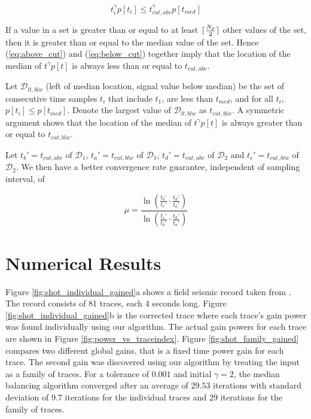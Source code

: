 \documentclass{segabs}
\DeclarePairedDelimiter{\ceil}{\lceil}{\rceil}
\newcommand{\Done}{{\mathcal{D}_1}}
\newcommand{\Dtwo}{{\mathcal{D}_2}}
\newcommand{\Dleftbelow}{{\mathcal{D}_{lt,blw}}}
\newcommand{\tcut}{t_{cut,abv}}
\newcommand{\tcutbelow}{t_{cut,blw}}
\begin{document}
\begin{equation}
\label{eq:below_cut}
t_i^\gamma p[t_i] \leq \tcut^\gamma p[t_{med}]
\end{equation} 

If a value in a set is greater than or equal to at least $\ceil{ \frac{N_p}{2}}$
other values of the set, then it is greater than or equal to the median value
of the set. Hence (\ref{eq:above_cut}) and (\ref{eq:below_cut}) together imply that the location of the median of $t^\gamma p[t]$ is always less than or equal to  $\tcut$. 



Let $\Dleftbelow$ (left of median location, signal value below median) be the set of consecutive time samples $t_i$ that include $t_1$, are less than $t_{med}$, and for all $t_i$, $p[t_i] \leq p[t_{med}]$.  Denote the largest value of $\Dleftbelow$ as $\tcutbelow$.  A symmetric argument shows that the location of the median of $t^\gamma p[t]$ is always greater than or equal to  $\tcutbelow$.

Let $t_b'=\tcut$ of $\Done$, $t_a'=\tcutbelow$ of $\Done$, $t_d'=\tcut$ of $\Dtwo$ and $t_c'=\tcutbelow$ of $\Dtwo$.  We then have a better convergence rate guarantee, independent of sampling interval,  of 

\begin{equation}
\mu = \frac{\ln \left(\frac{t_b'}{t_c'}\cdot \frac{t_d'}{t_a'} \right)}{\ln \left(\frac{t_c'}{t_b'}\cdot \frac{t_d'}{t_a'} \right)}
\end{equation}

\section{Numerical Results}

Figure \ref{fig:shot_individual_gained}a shows a field seismic record taken from \cite{yilmaz1983}.  The record consists of 81 traces, each 4 seconds long. Figure \ref{fig:shot_individual_gained}b is the corrected trace where each trace's gain power was found individually using our algorithm.  The actual gain powers for each trace are shown in Figure \ref{fig:power_vs_traceindex}.  Figure \ref{fig:shot_family_gained} compares two different global gains, that is a fixed time power gain for each trace.  The second gain was discovered using our algorithm by  treating the input as a family of traces. For a tolerance of $0.001$ and initial $\gamma=2$, the median balancing algorithm converged after an average of $29.53$ iterations with standard deviation of $9.7$ iterations for the individual traces and  $29$ iterations for the family of traces.
\end{document}
